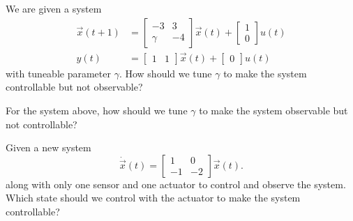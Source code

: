 

\begin{enumerate}




\qitem We are given a system 
\[
\begin{split}
{\vec{x}}(t+1) &= \begin{bmatrix} -3 & 3 \\ \gamma & -4 \end{bmatrix} \vec{x}(t) + \begin{bmatrix} 1 \\ 0 \end{bmatrix} u(t) \\
y(t) &= \begin{bmatrix} 1 & 1 \end{bmatrix} \vec x(t) + \begin{bmatrix} 0 \end{bmatrix} u(t)
\end{split} 
\]
with tuneable parameter $\gamma$. How should we tune $\gamma$ to make the system controllable but not observable? 




\qitem For the system above, how should we tune $\gamma$ to make the system observable but not controllable? 





\qitem Given a new system 
\[
\dot{\vec x}(t) = \begin{bmatrix} 1 & 0 \\ -1 & -2 \end{bmatrix} \vec x(t). 
\]
along with only one sensor and one actuator to control and observe the system. Which state should we control with the actuator to make the system controllable? 


\end{enumerate}
